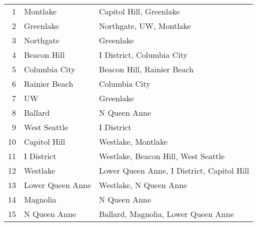 \documentclass{article}
\begin{document}
\begin{table}[!hbp] 
    \begin{tabular}{r l l} 
    \toprule 
        1 & Montlake & Capitol Hill, Greenlake \\
        2 & Greenlake & Northgate, UW, Montlake \\
        3 & Northgate & Greenlake \\
        4 & Beacon Hill & I District, Columbia City \\
        5 & Columbia City & Beacon Hill, Rainier Beach \\
        6 & Rainier Beach & Columbia City \\
        7 & UW & Greenlake \\
        8 & Ballard & N Queen Anne \\
        9 & West Seattle & I District \\
        10 & Capitol Hill & Westlake, Montlake \\
        11 & I District & Westlake, Beacon Hill, West Seattle \\
        12 & Westlake & Lower Queen Anne, I District, Capitol Hill \\
        13 & Lower Queen Anne & Westlake, N Queen Anne \\
        14 & Magnolia & N Queen Anne \\
        15 & N Queen Anne & Ballard, Magnolia, Lower Queen Anne \\
    \bottomrule
    \end{tabular} 
\end{table} 
\end{document}
